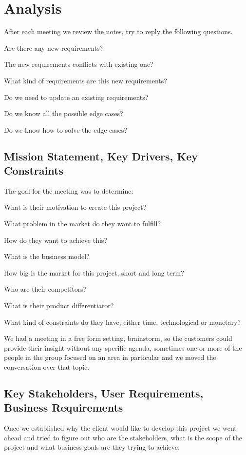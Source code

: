 \section{Analysis}
After each meeting we review the notes, try to reply the following questions.
\begin{packed_enum}
    \item Are there any new requirements?
    \item The new requirements conflicts with existing one?
    \item What kind of requirements are this new requirements?
    \item Do we need to update an existing requirements?
    \item Do we know all the possible edge cases?
    \item Do we know how to solve the edge cases?
\end{packed_enum}

\subsection{Mission Statement, Key Drivers, Key Constraints}
The goal for the meeting was to determine:
\begin{packed_enum}
    \item What is their motivation to create this project?
    \item What problem in the market do they want to fulfill?
    \item How do they want to achieve this?
    \item What is the business model?
    \item How big is the market for this project, short and long term?
    \item Who are their competitors?
    \item What is their product differentiator?
    \item What kind of constraints do they have, either time, 
    technological or monetary?
\end{packed_enum}

\noindent We had a meeting in a free form setting, brainstorm, so the customers could 
provide their insight without any specific agenda, sometimes one or more of the 
people in the group focused on an area in particular and we moved the 
conversation over that topic.

\pagebreak
\subsection{Key Stakeholders, User Requirements, Business Requirements}
Once we established why the client would like to develop this project we went 
ahead and tried to figure out who are the stakeholders, what is the scope of 
the project and what business goals are they trying to achieve. \newline

